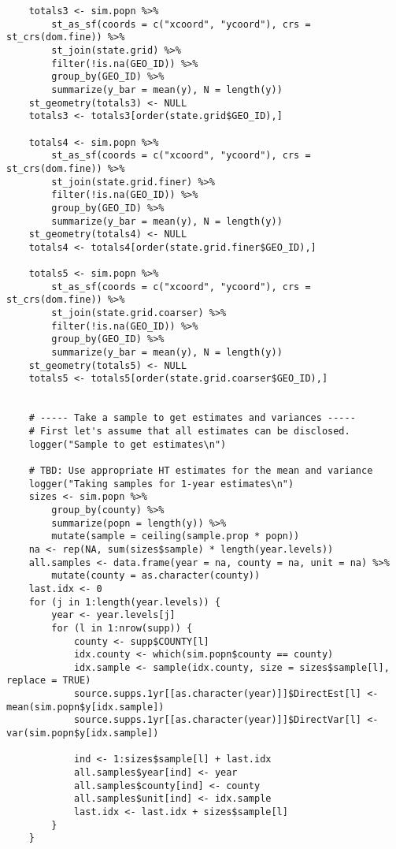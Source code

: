 \documentclass[12pt]{article}
\begin{document}
\begin{footnotesize}
\begin{verbatim}
    totals3 <- sim.popn %>%
        st_as_sf(coords = c("xcoord", "ycoord"), crs = st_crs(dom.fine)) %>%
        st_join(state.grid) %>%
        filter(!is.na(GEO_ID)) %>%
        group_by(GEO_ID) %>%
        summarize(y_bar = mean(y), N = length(y))
    st_geometry(totals3) <- NULL
    totals3 <- totals3[order(state.grid$GEO_ID),]

    totals4 <- sim.popn %>%
        st_as_sf(coords = c("xcoord", "ycoord"), crs = st_crs(dom.fine)) %>%
        st_join(state.grid.finer) %>%
        filter(!is.na(GEO_ID)) %>%
        group_by(GEO_ID) %>%
        summarize(y_bar = mean(y), N = length(y))
    st_geometry(totals4) <- NULL
    totals4 <- totals4[order(state.grid.finer$GEO_ID),]

    totals5 <- sim.popn %>%
        st_as_sf(coords = c("xcoord", "ycoord"), crs = st_crs(dom.fine)) %>%
        st_join(state.grid.coarser) %>%
        filter(!is.na(GEO_ID)) %>%
        group_by(GEO_ID) %>%
        summarize(y_bar = mean(y), N = length(y))
    st_geometry(totals5) <- NULL
    totals5 <- totals5[order(state.grid.coarser$GEO_ID),]


    # ----- Take a sample to get estimates and variances -----
    # First let's assume that all estimates can be disclosed.
    logger("Sample to get estimates\n")

    # TBD: Use appropriate HT estimates for the mean and variance
    logger("Taking samples for 1-year estimates\n")
    sizes <- sim.popn %>%
        group_by(county) %>%
        summarize(popn = length(y)) %>%
        mutate(sample = ceiling(sample.prop * popn))
    na <- rep(NA, sum(sizes$sample) * length(year.levels))
    all.samples <- data.frame(year = na, county = na, unit = na) %>%
        mutate(county = as.character(county))
    last.idx <- 0
    for (j in 1:length(year.levels)) {
        year <- year.levels[j]
        for (l in 1:nrow(supp)) {
            county <- supp$COUNTY[l]
            idx.county <- which(sim.popn$county == county)
            idx.sample <- sample(idx.county, size = sizes$sample[l], replace = TRUE)
            source.supps.1yr[[as.character(year)]]$DirectEst[l] <- mean(sim.popn$y[idx.sample])
            source.supps.1yr[[as.character(year)]]$DirectVar[l] <- var(sim.popn$y[idx.sample])

            ind <- 1:sizes$sample[l] + last.idx
            all.samples$year[ind] <- year
            all.samples$county[ind] <- county
            all.samples$unit[ind] <- idx.sample
            last.idx <- last.idx + sizes$sample[l]
        }
    }


\end{verbatim}
\end{footnotesize}
\end{document}
